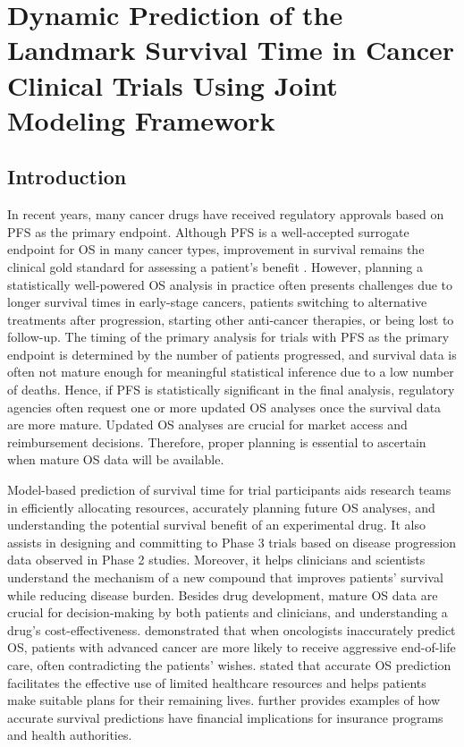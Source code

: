 \chapter{Dynamic Prediction of the Landmark Survival Time in Cancer Clinical Trials Using Joint Modeling Framework}
\label{chpt:chpt3}

\section{Introduction}
In recent years, many cancer drugs have received regulatory approvals based on \ac{PFS} as the primary endpoint. Although \ac{PFS} is a well-accepted surrogate endpoint for \ac{OS} in many cancer types, improvement in survival remains the clinical gold standard for assessing a patient's benefit \citep{tang2007surrogate, driscoll2009overall, methy2010surrogate, grigore2020surrogate}. However, planning a statistically well-powered \ac{OS} analysis in practice often presents challenges due to longer survival times in early-stage cancers, patients switching to alternative treatments after progression, starting other anti-cancer therapies, or being lost to follow-up. The timing of the primary analysis for trials with \ac{PFS} as the primary endpoint is determined by the number of patients progressed, and survival data is often not mature enough for meaningful statistical inference due to a low number of deaths. Hence, if \ac{PFS} is statistically significant in the final analysis, regulatory agencies often request one or more updated \ac{OS} analyses once the survival data are more mature. Updated \ac{OS} analyses are crucial for market access and reimbursement decisions. Therefore, proper planning is essential to ascertain when mature \ac{OS} data will be available.

Model-based prediction of survival time for trial participants aids research teams in efficiently allocating resources, accurately planning future \ac{OS} analyses, and understanding the potential survival benefit of an experimental drug. It also assists in designing and committing to Phase 3 trials based on disease progression data observed in Phase 2 studies. Moreover, it helps clinicians and scientists understand the mechanism of a new compound that improves patients' survival while reducing disease burden. Besides drug development, mature \ac{OS} data are crucial for decision-making by both patients and clinicians, and understanding a drug's cost-effectiveness. \cite{sborov2019impact} demonstrated that when oncologists inaccurately predict \ac{OS}, patients with advanced cancer are more likely to receive aggressive end-of-life care, often contradicting the patients' wishes. \cite{mackillop1997measuring} stated that accurate \ac{OS} prediction facilitates the effective use of limited healthcare resources and helps patients make suitable plans for their remaining lives. \cite{henderson2001accuracy} further provides examples of how accurate survival predictions have financial implications for insurance programs and health authorities.

